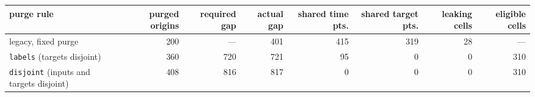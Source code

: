 \small
\begin{tabular}{lrrrrrrr}
\toprule
purge rule & purged origins & required gap & actual gap & shared time pts. & shared target pts. & leaking cells & eligible cells \\
\midrule
legacy, fixed purge & 200 & --- & 401 & 415 & 319 & 28 & --- \\
\texttt{labels} (targets disjoint) & 360 & 720 & 721 & 95 & 0 & 0 & 310 \\
\texttt{disjoint} (inputs and targets disjoint) & 408 & 816 & 817 & 0 & 0 & 0 & 310 \\
\bottomrule
\end{tabular}